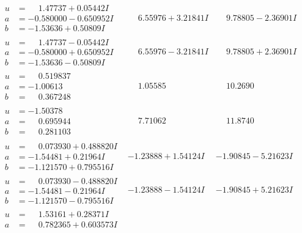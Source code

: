 \documentclass[1p]{elsarticle_modified}
\theoremstyle{definition}
\begin{document}
$$\begin{array}{c|c|c}
\begin{aligned}
u &= \phantom{-}1.47737 + 0.05442 I \\
a &= -0.580000 - 0.650952 I \\
b &= -1.53636 + 0.50809 I\end{aligned}
 & \phantom{-}6.55976 + 3.21841 I & \phantom{-}9.78805 - 2.36901 I \\ \hline\begin{aligned}
u &= \phantom{-}1.47737 - 0.05442 I \\
a &= -0.580000 + 0.650952 I \\
b &= -1.53636 - 0.50809 I\end{aligned}
 & \phantom{-}6.55976 - 3.21841 I & \phantom{-}9.78805 + 2.36901 I \\ \hline\begin{aligned}
u &= \phantom{-}0.519837\phantom{ +0.000000I} \\
a &= -1.00613\phantom{ +0.000000I} \\
b &= \phantom{-}0.367248\phantom{ +0.000000I}\end{aligned}
 & \phantom{-}1.05585\phantom{ +0.000000I} & \phantom{-}10.2690\phantom{ +0.000000I} \\ \hline\begin{aligned}
u &= -1.50378\phantom{ +0.000000I} \\
a &= \phantom{-}0.695944\phantom{ +0.000000I} \\
b &= \phantom{-}0.281103\phantom{ +0.000000I}\end{aligned}
 & \phantom{-}7.71062\phantom{ +0.000000I} & \phantom{-}11.8740\phantom{ +0.000000I} \\ \hline\begin{aligned}
u &= \phantom{-}0.073930 + 0.488820 I \\
a &= -1.54481 + 0.21964 I \\
b &= -1.121570 + 0.795516 I\end{aligned}
 & -1.23888 + 1.54124 I & -1.90845 - 5.21623 I \\ \hline\begin{aligned}
u &= \phantom{-}0.073930 - 0.488820 I \\
a &= -1.54481 - 0.21964 I \\
b &= -1.121570 - 0.795516 I\end{aligned}
 & -1.23888 - 1.54124 I & -1.90845 + 5.21623 I \\ \hline\begin{aligned}
u &= \phantom{-}1.53161 + 0.28371 I \\
a &= \phantom{-}0.782365 + 0.603573 I \\

\end{aligned}
\end{array}$$
\end{document}
